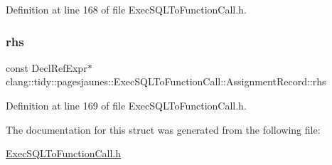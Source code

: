 Definition at line 168 of file Exec\+S\+Q\+L\+To\+Function\+Call.\+h.

\mbox{\label{structclang_1_1tidy_1_1pagesjaunes_1_1_exec_s_q_l_to_function_call_1_1_assignment_record_a492361f28ded0085f8322549b338f713}} 
\subsubsection{\texorpdfstring{rhs}{rhs}}
{\footnotesize\ttfamily const Decl\+Ref\+Expr$\ast$ clang\+::tidy\+::pagesjaunes\+::\+Exec\+S\+Q\+L\+To\+Function\+Call\+::\+Assignment\+Record\+::rhs}



Definition at line 169 of file Exec\+S\+Q\+L\+To\+Function\+Call.\+h.



The documentation for this struct was generated from the following file\+:\begin{DoxyCompactItemize}
\item 
\hyperlink{_exec_s_q_l_to_function_call_8h}{Exec\+S\+Q\+L\+To\+Function\+Call.\+h}\end{DoxyCompactItemize}
